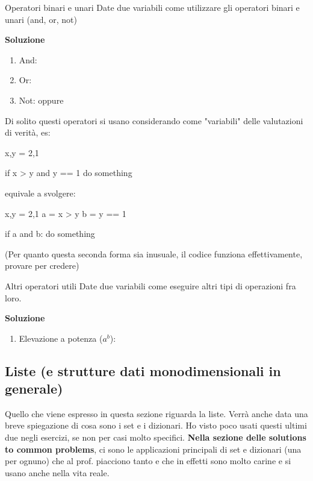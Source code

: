 \documentclass[10pt]{extarticle}
\makeatletter
\newcommand{\<}{\langle}
\renewcommand{\>}{\rangle}
\renewenvironment{proof}[1][\proofname] {\par\pushQED{\qed}
\renewcommand*{\proofname}{Soluzione}
{\normalfont\sffamily\bfseries\topsep6\p@\@plus6\p@\relax #1\@addpunct{.} }}{\popQED\endtrivlist\@endpefalse}
\theoremstyle{mystyle}{\newtheorem*{remark}{Nota}}
\theoremstyle{mystyle}{\newtheorem*{remarks}{Note}}
\theoremstyle{mystyle}{\newtheorem*{example}{Esempio}}
\theoremstyle{mystyle}{\newtheorem*{examples}{Esempi}}
\theoremstyle{definition}{\newtheorem*{exercise}{Exercise}}
\theoremstyle{warn}
\makeatother
\begin{document}
\begin{definition}{Operatori binari e unari}{}
Date due variabili  come utilizzare gli operatori binari e unari (and, or, not)
\end{definition}
\begin{proof}
\begin{enumerate}
    \item And: 
    \item Or: 
    \item Not:  oppure 
\end{enumerate}
\end{proof}
\begin{remark}
Di solito questi operatori si usano considerando come "variabili" delle valutazioni di verità, es:
\begin{python}
x,y = 2,1

if x > y and y == 1
    do something
\end{python}
equivale a svolgere:
\begin{python}
x,y = 2,1
a = x > y
b = y == 1

if a and b:
    do something
\end{python}
(Per quanto questa seconda forma sia inusuale, il codice funziona effettivamente, provare per credere)
\end{remark}
\begin{definition}{Altri operatori utili}{}
Date due variabili  come eseguire altri tipi di operazioni fra loro.
\end{definition}
\begin{proof}
\begin{enumerate}
    \item Elevazione a potenza ($a^b$): 
\end{enumerate}
\end{proof}

\newpage
\subsection{Liste (e strutture dati monodimensionali in generale)}
Quello che viene espresso in questa sezione riguarda la liste. Verrà anche data una breve spiegazione di cosa sono i set e i dizionari. Ho visto poco usati questi ultimi due negli esercizi, se non per casi molto specifici. \textbf{Nella sezione delle solutions to common problems}, ci sono le applicazioni principali di set e dizionari (una per ognuno) che al prof. piacciono tanto e che in effetti sono molto carine e si usano anche nella vita reale.
\end{document}

